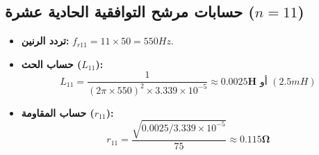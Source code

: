 
\subsection{حسابات مرشح التوافقية الحادية عشرة ($n=11$)}
\begin{itemize}
    \item \textbf{تردد الرنين:} $f_{r11} = 11 \times 50 = 550 Hz$.
    \item \textbf{حساب الحث ($L_{11}$):}
    \begin{equation*}
        L_{11} = \frac{1}{(2 \pi \times 550)^2 \times 3.339 \times 10^{-5}} \approx \mathbf{0.0025 H} \text{ أو } (2.5 mH)
    \end{equation*}
    \item \textbf{حساب المقاومة ($r_{11}$):}
    \begin{equation*}
        r_{11} = \frac{\sqrt{0.0025 / 3.339 \times 10^{-5}}}{75} \approx \mathbf{0.115 \Omega}
    \end{equation*}
\end{itemize}
